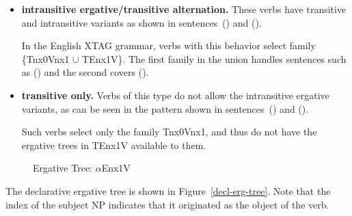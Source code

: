 \begin{itemize}
\item {\bf intransitive ergative/transitive alternation.}  These verbs
have transitive and intransitive variants as shown in sentences~() and
().


In the English XTAG grammar, verbs with this behavior select family
\{Tnx0Vnx1 $\cup$ TEnx1V\}.  The first family in the union handles
sentences such as () and the second covers ().

\item {\bf transitive only.}  Verbs of this type do not allow the
intransitive ergative variants, as can be seen in the pattern shown in
sentences~() and ().


Such verbs select only the family Tnx0Vnx1, and thus do not have the
ergative trees in TEnx1V available to them.

\end{itemize}

\begin{figure}[htb]
\centering
\mbox{}
\caption{Ergative Tree: $\alpha$Enx1V}
\label{decl-erg-tree}
\label{2;14,1}
\end{figure}

The declarative ergative tree is shown in Figure~\ref{decl-erg-tree}.
Note that the index of the subject NP indicates that it originated as
the object of the verb.























